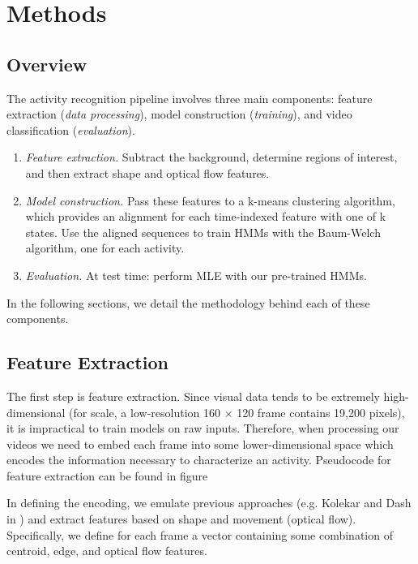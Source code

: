 \documentclass{article}
\begin{document}
\section{Methods}

\subsection{Overview}

The activity recognition pipeline involves three main components: feature extraction (\textit{data processing}), model construction (\textit{training}), and video classification (\textit{evaluation}).

\begin{enumerate}
    \item \textit{Feature extraction.} Subtract the background, determine regions of interest, and then extract shape and optical flow features.
    \item \textit{Model construction.} Pass these features to a k-means clustering algorithm, which provides an alignment for each time-indexed feature with one of k states. Use the aligned sequences to train HMMs with the Baum-Welch algorithm, one for each activity.
    \item \textit{Evaluation.} At test time: perform MLE with our pre-trained HMMs.
\end{enumerate}

In the following sections, we detail the methodology behind each of these components.

\subsection{Feature Extraction}

The first step is feature extraction. Since visual data tends to be extremely high-dimensional (for scale, a low-resolution 160 $\times$ 120 frame contains 19,200 pixels), it is impractical to train models on raw inputs. Therefore, when processing our videos we need to embed each frame into some lower-dimensional space which encodes the information necessary to characterize an activity. Pseudocode for feature extraction can be found in figure 

In defining the encoding, we emulate previous approaches (e.g. Kolekar and Dash in \cite{kd2016}) and extract features based on shape and movement (optical flow). Specifically, we define for each frame a vector containing some combination of centroid, edge, and optical flow features.
\end{document}
